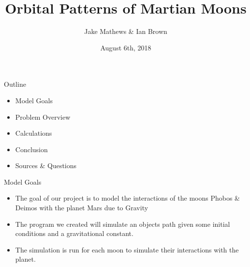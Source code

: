 \documentclass{beamer}	%
\title[Orbital Patterns of Martian Moons]{Orbital Patterns of Martian Moons}
\author{Jake Mathews \& Ian Brown}
\institute{Wentworth Institute of Technology}
\date{August 6th, 2018}
\begin{document}
\begin{frame}
\titlepage
\end{frame}


\begin{frame}{Outline} %

 \begin{itemize}
  \item Model Goals
  \item Problem Overview
  \item Calculations
  \item Conclusion
  \item Sources \& Questions
 \end{itemize}

\end{frame}


\begin{frame}{Model Goals} %
\begin{itemize}
	\item The goal of our project is to model the interactions of the moons Phobos \& Deimos with the planet Mars due to Gravity
	\item The program we created will simulate an objects path given some initial conditions and a gravitational constant. 
	\item The simulation is run for each moon to simulate their interactions with the planet.
\end{itemize}
\end{frame}
\end{document}
